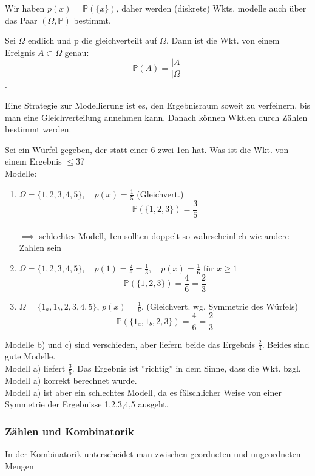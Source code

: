 \documentclass[a4paper,12pt]{article}
\newcounter{Section} %
\newcounter{Definition}[Section]
\newcounter{Beispiel}[Definition]
\newcommand{\Bem}[2][]{ %
	
	\begin{tcolorbox}[breakable,colback=yellow!5,colframe=yellow!65!black,title=\textbf{Bemerkung: #1}]
		{#2}
	\end{tcolorbox}
	
}
\newcommand{\Bsp}[3][]{ %
	\stepcounter{Beispiel}
	\begin{tcolorbox}[breakable,colback=green!0,colframe=green!50!black,title=\textbf{Beispiel\quad #1:}]
		{#2}
		{ #3}
	\end{tcolorbox}
}
\newcommand{\bspe}[1]{ %
	\begin{enumerate}[label=\alph*)]
		#1
	\end{enumerate}
}
\newcommand{\Prop}[2][]{ %
	\stepcounter{Definition}
	\begin{tcolorbox}[breakable,colback=red!0,colframe=red!50!black,title=\textbf{Proposition 	\arabic{Definition} \quad #1:}]
		{#2}
	\end{tcolorbox}
}
\begin{document}
		\Bem{ 
			Wir haben $p(x)=\mathbb{P}(\{x\})$, daher werden (diskrete) Wkts. modelle auch über das Paar $(\Omega, \mathbb{P})$ bestimmt.
		}
		\Prop{
			Sei $\Omega$ endlich und  p die gleichverteilt auf $\Omega$. Dann ist die Wkt. von einem Ereignis $A\subset \Omega$ genau:
			\[\mathbb{P}(A)=\frac{|A|}{|\Omega|}\].\\
			\Bem{
				Eine Strategie zur Modellierung ist es, den Ergebnisraum soweit zu verfeinern, bis man eine Gleichverteilung annehmen kann. Danach können Wkt.en durch Zählen bestimmt werden.
			}
		}
		\Bsp{
			Sei ein Würfel gegeben, der statt einer 6 zwei 1en hat. Was ist die Wkt. von einem Ergebnis $\leq 3$? \qquad \\Modelle:
		}{
			\bspe{
				\item  $\Omega = \{1,2,3,4,5\}, \quad p(x)= \frac{1}{5}$ (Gleichvert.)\\
				\[\mathbb{P}(\{1,2,3\})=\frac{3}{5}\]\\
				$\implies$ schlechtes Modell, 1en sollten doppelt so wahrscheinlich wie andere Zahlen sein
				
				\item $\Omega = \{1,2,3,4,5\}, \quad p(1) = \frac{2}{6}=\frac{1}{3}, \quad p(x)= \frac{1}{6}$ für $x \geq 1$\\
				\[\mathbb{P}(\{1,2,3\})=\frac{4}{6}=\frac{2}{3}\]
				
				\item $\Omega=\{1_a,1_b,2,3,4,5\}$,\qquad
				$p(x)=\frac{1}{6}$, (Gleichvert. wg. Symmetrie des Würfels)\\
				\[\mathbb{P}(\{1_a,1_b,2,3\})=\frac{4}{6}=\frac{2}{3}\]
			}
			Modelle b) und c) sind verschieden, aber liefern beide das Ergebnis $\frac{2}{3}$. Beides sind gute Modelle.\\
			Modell a) liefert $\frac{3}{5}$. Das Ergebnis ist ''richtig'' in dem Sinne, dass die Wkt. bzgl. Modell a)  korrekt berechnet wurde. \\
			Modell a) ist aber ein schlechtes Modell, da es fälschlicher Weise von einer Symmetrie der Ergebnisse 1,2,3,4,5 ausgeht.
		}

		\newpage
		\subsubsection{Zählen und Kombinatorik} 
		
		In der Kombinatorik unterscheidet man zwischen geordneten und ungeordneten Mengen
		
\end{document}
